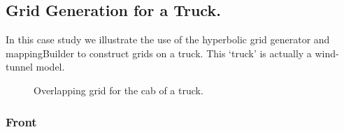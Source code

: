 \subsection{Grid Generation for a Truck.}

  In this case study we illustrate the use of the hyperbolic grid generator
and mappingBuilder to construct grids on a truck. This `truck' is actually
a wind-tunnel model.


\newcommand{\truckFigures}{\homeHenshaw/Overture/hype/cmd/truck}


{
\newcommand{\figWidthd}{10cm}
\newcommand{\trimfig}[2]{\trimPlot{#1}{#2}{.0}{.0}{.1}{.1}}
\begin{figure}[hbt]
\begin{center}
\end{center}
\caption{Overlapping grid for the cab of a truck.}\label{fig:cabTender}
\end{figure}
}



\subsubsection{Front}


